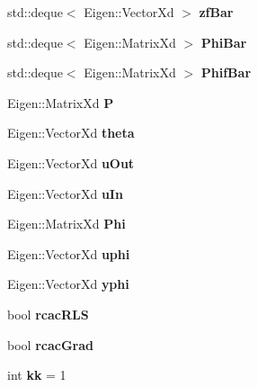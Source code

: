 \begin{DoxyCompactItemize}
\mbox{\label{class_r_c_a_c_a774f6216c9c24390701d09c4630dc95d}} 
std\+::deque$<$ Eigen\+::\+Vector\+Xd $>$ {\bfseries zf\+Bar}
\item 
\mbox{\label{class_r_c_a_c_a083bb4d49144a9820f28f637c8ba6eb5}} 
std\+::deque$<$ Eigen\+::\+Matrix\+Xd $>$ {\bfseries Phi\+Bar}
\item 
\mbox{\label{class_r_c_a_c_aa59f73c94933eeb7ade8f8d45533feb1}} 
std\+::deque$<$ Eigen\+::\+Matrix\+Xd $>$ {\bfseries Phif\+Bar}
\item 
\mbox{\label{class_r_c_a_c_ad6bc8005d9983494ee607b697cd85ed7}} 
Eigen\+::\+Matrix\+Xd {\bfseries P}
\item 
\mbox{\label{class_r_c_a_c_a06851b7327e7c9095da5e8525dc84889}} 
Eigen\+::\+Vector\+Xd {\bfseries theta}
\item 
\mbox{\label{class_r_c_a_c_a7c1ba0823d931007e737fc77b9489543}} 
Eigen\+::\+Vector\+Xd {\bfseries u\+Out}
\item 
\mbox{\label{class_r_c_a_c_a9759ecd4b93ba787d029f08f92340f08}} 
Eigen\+::\+Vector\+Xd {\bfseries u\+In}
\item 
\mbox{\label{class_r_c_a_c_a0779330dae6494cfbc0c35c777ab9ba0}} 
Eigen\+::\+Matrix\+Xd {\bfseries Phi}
\item 
\mbox{\label{class_r_c_a_c_a958fc9610d01f86f345238dffc88d925}} 
Eigen\+::\+Vector\+Xd {\bfseries uphi}
\item 
\mbox{\label{class_r_c_a_c_af6ed65d38af325245d6857f4a709e1a5}} 
Eigen\+::\+Vector\+Xd {\bfseries yphi}
\item 
\mbox{\label{class_r_c_a_c_a3502183205d4805bcb23c470adedc998}} 
bool {\bfseries rcac\+R\+LS}
\item 
\mbox{\label{class_r_c_a_c_acc23e081e96a8fd2dccccc8d0c0b7cdd}} 
bool {\bfseries rcac\+Grad}
\item 
\mbox{\label{class_r_c_a_c_ae965d44ced29623c260b51b4be928b77}} 
int {\bfseries kk} = 1
\end{DoxyCompactItemize}


